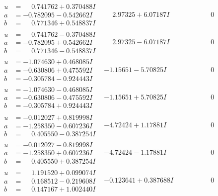 \documentclass[1p]{elsarticle_modified}
\theoremstyle{definition}
\begin{document}
$$\begin{array}{c|c|c}
\begin{aligned}
u &= \phantom{-}0.741762 + 0.370488 I \\
a &= -0.782095 - 0.542662 I \\
b &= \phantom{-}0.771346 + 0.548837 I\end{aligned}
 & \phantom{-}2.97325 + 6.07187 I & \phantom{-0.000000 } 0 \\ \hline\begin{aligned}
u &= \phantom{-}0.741762 - 0.370488 I \\
a &= -0.782095 + 0.542662 I \\
b &= \phantom{-}0.771346 - 0.548837 I\end{aligned}
 & \phantom{-}2.97325 - 6.07187 I & \phantom{-0.000000 } 0 \\ \hline\begin{aligned}
u &= -1.074630 + 0.468085 I \\
a &= -0.630806 + 0.475592 I \\
b &= -0.305784 - 0.924443 I\end{aligned}
 & -1.15651 - 5.70825 I & \phantom{-0.000000 } 0 \\ \hline\begin{aligned}
u &= -1.074630 - 0.468085 I \\
a &= -0.630806 - 0.475592 I \\
b &= -0.305784 + 0.924443 I\end{aligned}
 & -1.15651 + 5.70825 I & \phantom{-0.000000 } 0 \\ \hline\begin{aligned}
u &= -0.012027 + 0.819998 I \\
a &= -1.258350 - 0.607236 I \\
b &= \phantom{-}0.405550 - 0.387254 I\end{aligned}
 & -4.72424 + 1.17881 I & \phantom{-0.000000 } 0 \\ \hline\begin{aligned}
u &= -0.012027 - 0.819998 I \\
a &= -1.258350 + 0.607236 I \\
b &= \phantom{-}0.405550 + 0.387254 I\end{aligned}
 & -4.72424 - 1.17881 I & \phantom{-0.000000 } 0 \\ \hline\begin{aligned}
u &= \phantom{-}1.191520 + 0.099074 I \\
a &= \phantom{-}0.168512 - 0.219608 I \\
b &= \phantom{-}0.147167 + 1.002440 I\end{aligned}
 & -0.123641 + 0.387688 I & \phantom{-0.000000 } 0 \\ \hline\begin{aligned}

\end{aligned}
\end{array}$$
\end{document}
